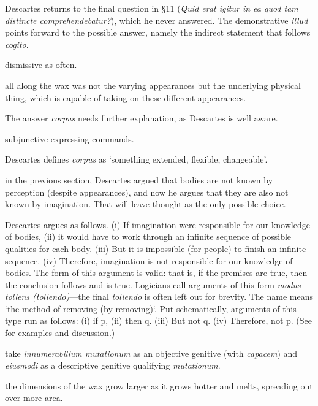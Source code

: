  Descartes returns to the final question in §11 (\textit{Quid erat igitur in ea quod tam distincte comprehendebatur?}), which he never answered. The demonstrative \textit{illud} points forward to the possible answer, namely the indirect statement that follows \textit{cogito}. 

 dismissive as often.

 all along the wax was not the varying appearances but the underlying physical thing, which is capable of taking on these different appearances.

 The answer \textit{corpus} needs further explanation, as Descartes is well aware.

 subjunctive expressing commands.

 Descartes defines \textit{corpus} as `something extended, flexible, changeable'.

 in the previous section, Descartes argued that bodies are not known by perception (despite appearances), and now he argues that they are also not known by imagination. That will leave thought as the only possible choice.

 Descartes argues as follows. (i) If imagination were responsible for our knowledge of bodies, (ii) it would have to work through an infinite sequence of possible qualities for each body. (iii) But it is impossible (for people) to finish an infinite sequence. (iv) Therefore, imagination is not responsible for our knowledge of bodies. The form of this argument is valid: that is, if the premises are true, then the conclusion follows and is true. Logicians call arguments of this form \textit{modus tollens (tollendo)}---the final \textit{tollendo} is often left out for brevity. The name means `the method of removing (by removing)`. Put schematically, arguments of this type run as follows: (i) if p, (ii) then q. (iii) But not q. (iv) Therefore, not p. (See \citep[§23]{weston2009} for examples and discussion.)

 take \textit{innumerabilium mutationum} as an objective genitive (with \textit{capacem}) and \textit{eiusmodi} as a descriptive genitive qualifying \textit{mutationum}.

 the dimensions of the wax grow larger as it grows hotter and melts, spreading out over more area.

